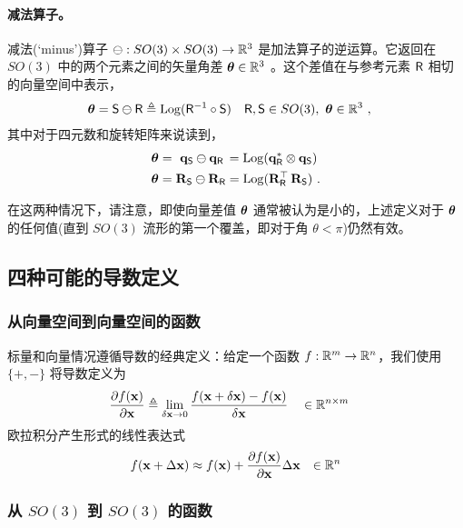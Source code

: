 \paragraph{减法算子。}
减法(`minus')算子 $\ominus:SO(3)\times SO(3)\to{\mathbb R}^3$ 是加法算子的逆运算。它返回在 $SO(3)$ 中的两个元素之间的矢量角差 ${\bm \theta}\in{\mathbb R}^3$ 。这个差值在与参考元素 $\mathsf R$ 相切的向量空间中表示，
%
\begin{align}
{\bm \theta}=\mathsf S\ominus \mathsf R
&\triangleq \operatorname*{Log}(\mathsf R^{-1} \circ \mathsf S)     && \mathsf R,\mathsf S\in SO(3),~ {\bm \theta}\in{\mathbb R}^3  
~,
\end{align}
%
其中对于四元数和旋转矩阵来说读到，
%
\begin{align}
{\bm \theta} &= \,\,{\bf q}_\mathsf S\ominus{\bf q}_\mathsf R\, = \operatorname*{Log}({\bf q}_\mathsf R^*\otimes{\bf q}_\mathsf S)                      \\
{\bm \theta} &= {\bf R}_\mathsf S\ominus{\bf R}_\mathsf R = \operatorname*{Log}({\bf R}_\mathsf R^{\top}\,{\bf R}_\mathsf S)
~.
\end{align}

\bigskip
在这两种情况下，请注意，即使向量差值 ${\bm \theta}$ 通常被认为是小的，上述定义对于 ${\bm \theta}$ 的任何值(直到 $SO(3)$ 流形的第一个覆盖，即对于角 $\theta<\pi$)仍然有效。

\subsection{四种可能的导数定义}



\subsubsection{从向量空间到向量空间的函数}

标量和向量情况遵循导数的经典定义：给定一个函数 $f:{\mathbb R}^m\to{\mathbb R}^n$，我们使用 $\{+,-\}$ 将导数定义为
%
\begin{align}
\frac{\partial f({\bf x})}{\partial{\bf x}} &\triangleq \lim_{\delta{\bf x}\to0}\frac{f({\bf x}+\delta{\bf x})-f({\bf x})}{\delta{\bf x}} &&\in {\mathbb R}^{n\times m} \label{equ:derivative_vector}
\end{align}
%
欧拉积分产生形式的线性表达式
%
\begin{align*}
f({\bf x}+\Delta{\bf x}) &\approx f({\bf x}) + \frac{\partial f({\bf x})}{\partial{\bf x}}\Delta{\bf x}
& \in {\mathbb R}^n
\end{align*}

\subsubsection{从 $SO(3)$ 到 $SO(3)$ 的函数}

